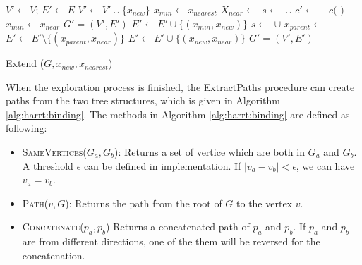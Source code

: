 \documentclass[letterpaper, 10 pt, conference]{ieeeconf}
\begin{document}
\begin{algorithm}[hbtp]
	\begin{algorithmic}[1]
		\State $ V' \leftarrow V $; $ E' \leftarrow E $
		\State $ V' \leftarrow V' \cup \{ x_{new} \} $
		\State $ x_{min} \leftarrow x_{nearest} $
		\State $ X_{near} \leftarrow $ 
		\State $ s \leftarrow $  $ \cup $ 
					\State $ c' \leftarrow $  $ + c( $  $ ) $ 
						\State $ x_{min} \leftarrow x_{near} $
					\EndIf
				\EndIf
			\EndFor
		\Else
		    \State \Return $ G' = (V', E') $ 		
		\EndIf
		\State $ E' \leftarrow E' \cup \{ ( x_{min}, x_{new} ) \} $
			    \State $ s \leftarrow $  $ \cup $ 
					\State $ x_{parent} \leftarrow $ 
					\State $ E' \leftarrow E' \setminus \{ ( x_{parent}, x_{near} ) \} $
					\State $ E' \leftarrow E' \cup \{ ( x_{new}, x_{near} ) \} $
				\EndIf
			\EndIf
		\EndFor
		\Return $ G' = (V', E') $ 
	\end{algorithmic}
\caption{ {\sc Extend } ($ G, x_{new}, x_{nearest} $) }
\label{alg:harrt:extend}
\end{algorithm}

When the exploration process is finished, the {\sc ExtractPaths} procedure can create paths from the two tree structures, which is given in Algorithm \ref{alg:harrt:binding}.
The methods in Algorithm \ref{alg:harrt:binding} are defined as following:
\begin{itemize}
	\item \textsc{SameVertices}($ G_{a}, G_{b} $):
	Returns a set of vertice which are both in $ G_{a} $ and $ G_{b} $.
	A threshold $ \epsilon $ can be defined in implementation.
	If $ | v_{a} - v_{b} | < \epsilon $, we can have $ v_{a} = v_{b} $.
	\item \textsc{Path}($ v, G $):	
	Returns the path from the root of $ G $ to the vertex $ v $.
	\item \textsc{Concatenate}{($ p_{a}, p_{b} $)}
	Returns a concatenated path of $ p_{a} $ and $  p_{b} $.
	If $ p_{a} $ and $  p_{b} $ are from different directions, one of the them will be reversed for the concatenation.
\end{itemize}
\end{document}
